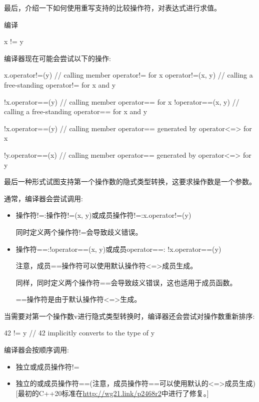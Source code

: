 最后，介绍一下如何使用重写支持的比较操作符，对表达式进行求值。


编译

\begin{cpp}
x != y
\end{cpp}

编译器现在可能会尝试以下的操作:

\begin{cpp}
x.operator!=(y) // calling member operator!= for x
operator!=(x, y) // calling a free-standing operator!= for x and y

!x.operator==(y) // calling member operator== for x
!operator==(x, y) // calling a free-standing operator== for x and y

!x.operator==(y) // calling member operator== generated by operator<=> for x

!y.operator==(x) // calling member operator== generated by operator<=> for y
\end{cpp}

最后一种形式试图支持第一个操作数的隐式类型转换，这要求操作数是一个参数。

通常，编译器会尝试调用:

\begin{itemize}
\item
操作符!=:操作符!=(x, y)或成员操作符!=:x.operator!=(y)

同时定义两个操作符!=会导致歧义错误。

\item
操作符==:!operator==(x, y)或成员operator==: !x.operator==(y)

注意，成员==操作符可以使用默认操作符<=>成员生成。

同样，同时定义两个操作符==会导致歧义错误，这也适用于成员函数。

==操作符是由于默认操作符<=>生成。
\end{itemize}

当需要对第一个操作数v进行隐式类型转换时，编译器还会尝试对操作数重新排序:

\begin{cpp}
42 != y // 42 implicitly converts to the type of y
\end{cpp}

编译器会按顺序调用:

\begin{itemize}
\item
独立或成员操作符!=

\item
独立的或成员操作符==(注意，成员操作符==可以使用默认的<=>成员生成)[最初的C++20标准在\url{http://wg21.link/p2468r2}中进行了修复。]
\end{itemize}

